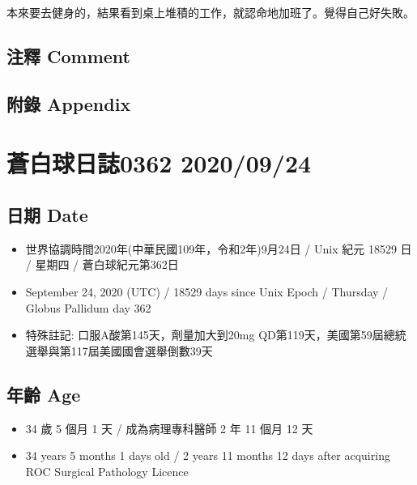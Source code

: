 \documentclass[a5paper, 11pt
]{book}
\providecommand{\tightlist}{%
  \setlength{\itemsep}{0pt}\setlength{\parskip}{0pt}}
\begin{document}
本來要去健身的，結果看到桌上堆積的工作，就認命地加班了。覺得自己好失敗。

\hypertarget{ux6ce8ux91cb-comment-22}{%
\subsection{注釋 Comment}\label{ux6ce8ux91cb-comment-22}}

\hypertarget{ux9644ux9304-appendix-22}{%
\subsection{附錄 Appendix}\label{ux9644ux9304-appendix-22}}

\hypertarget{ux84bcux767dux7403ux65e5ux8a8c0362-20200924}{%
\section{蒼白球日誌0362
2020/09/24}\label{ux84bcux767dux7403ux65e5ux8a8c0362-20200924}}

\hypertarget{ux65e5ux671f-date-23}{%
\subsection{日期 Date}\label{ux65e5ux671f-date-23}}

\begin{itemize}
\tightlist
\item
  世界協調時間2020年(中華民國109年，令和2年)9月24日 / Unix 紀元 18529 日
  / 星期四 / 蒼白球紀元第362日
\item
  September 24, 2020 (UTC) / 18529 days since Unix Epoch / Thursday /
  Globus Pallidum day 362
\item
  特殊註記: 口服A酸第145天，劑量加大到20mg
  QD第119天，美國第59屆總統選舉與第117屆美國國會選舉倒數39天
\end{itemize}

\hypertarget{ux5e74ux9f61-age-23}{%
\subsection{年齡 Age}\label{ux5e74ux9f61-age-23}}

\begin{itemize}
\tightlist
\item
  34 歲 5 個月 1 天 / 成為病理專科醫師 2 年 11 個月 12 天
\item
  34 years 5 months 1 days old / 2 years 11 months 12 days after
  acquiring ROC Surgical Pathology Licence
\end{itemize}
\end{document}
